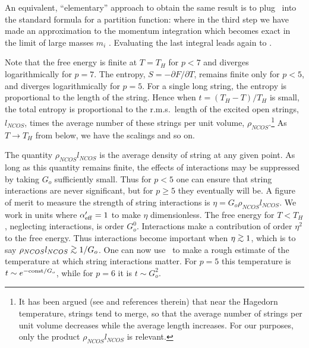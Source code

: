 An equivalent, ``elementary'' approach to obtain the same result is to
plug \RhoBehave\ into the standard formula for a partition function:
 where in the third step we have made an approximation to the momentum
integration which becomes exact in the limit of 
large masses $m_i$ \cite{Eli}.
Evaluating the last integral leads again to \FBehave.

Note that the free energy is finite at $T=T_H$ for $p<7$ and diverges
logarithmically for $p=7$.  The entropy, $S = -\partial F/\partial T$,
remains finite only for $p<5$, and diverges logarithmically for $p=5$.
For a single long string, the entropy is proportional to the length of
the string.  Hence when $t = (T_H-T)/T_H$ is small, the total entropy
is proportional to the r.m.s.\ length of the excited open strings,
$l_{NCOS}$, times the average number of these strings per unit volume,
$\rho_{NCOS}$.\footnote{It has been argued (see \cite{Bowick,Tan,Lowe} and
references therein) that near the Hagedorn temperature, strings tend
to merge, so that the average number of strings per unit volume
decreases while the average length increases.  For our purposes, only
the product $\rho_{NCOS} l_{NCOS}$ is relevant.}  As $T \to T_H$ from
below, we have the scalings
 and so on.

The quantity $\rho_{NCOS} l_{NCOS}$ is the average density of string
at any given point.  As long as this quantity remains finite, the
effects of interactions may be suppressed by taking $G_o$ sufficiently
small.  Thus for $p < 5$ one can ensure that string
interactions are never significant, but for $p \geq 5$ they eventually
will be.  A figure of merit to measure the strength of string
interactions is $\eta = G_o \rho_{NCOS} l_{NCOS}$.  We work in units
where $\alpha'_{\rm eff} = 1$ to make $\eta$ dimensionless.  The free
energy for $T<T_H$, neglecting interactions, is order $G_o^0$.  
Interactions make a
contribution of order $\eta^2$ to the free energy.  Thus interactions
become important when $\eta \gsim 1$, which is to say $\rho_{NCOS}
l_{NCOS} \gsim 1/G_o$.  One can now use \length\ to make a rough
estimate of the temperature at which string interactions matter.  For
$p=5$ this temperature is $t \sim e^{-{\rm const}/G_o}$, while for $p=6$ it
is $t \sim G_o^2$.  

